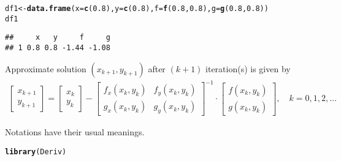 \documentclass[11pt, a4paper]{article}\usepackage[]{graphicx}\usepackage[]{xcolor}
\makeatletter
\newcommand{\hlnum}[1]{\textcolor[rgb]{0.686,0.059,0.569}{#1}}%
\newcommand{\hldef}[1]{\textcolor[rgb]{0.345,0.345,0.345}{#1}}%
\newcommand{\hlkwb}[1]{\textcolor[rgb]{0.69,0.353,0.396}{#1}}%
\newcommand{\hlkwc}[1]{\textcolor[rgb]{0.333,0.667,0.333}{#1}}%
\newcommand{\hlkwd}[1]{\textcolor[rgb]{0.737,0.353,0.396}{\textbf{#1}}}%
\newenvironment{kframe}{%
 \def\at@end@of@kframe{}%
 \ifinner\ifhmode%
  \def\at@end@of@kframe{\end{minipage}}%
  \begin{minipage}{\columnwidth}%
 \fi\fi%
 \def\FrameCommand##1{\hskip\@totalleftmargin \hskip-\fboxsep
 \colorbox{shadecolor}{##1}\hskip-\fboxsep
     \hskip-\linewidth \hskip-\@totalleftmargin \hskip\columnwidth}%
 \MakeFramed {\advance\hsize-\width
   \@totalleftmargin\z@ \linewidth\hsize
   \@setminipage}}%
 {\par\unskip\endMakeFramed%
 \at@end@of@kframe}
\newenvironment{knitrout}{}{} %
\makeatother
\begin{document}
\begin{knitrout}\footnotesize
{}\color{fgcolor}\begin{kframe}
\begin{alltt}
\hldef{df1} \hlkwb{<-} \hlkwd{data.frame}\hldef{(}\hlkwc{x} \hldef{=} \hlkwd{c}\hldef{(}\hlnum{0.8}\hldef{),} \hlkwc{y} \hldef{=} \hlkwd{c}\hldef{(}\hlnum{0.8}\hldef{),} \hlkwc{f} \hldef{=} \hlkwd{f}\hldef{(}\hlnum{0.8}\hldef{,} \hlnum{0.8}\hldef{),} \hlkwc{g} \hldef{=} \hlkwd{g}\hldef{(}\hlnum{0.8}\hldef{,} \hlnum{0.8}\hldef{))}
\hldef{df1}
\end{alltt}
\begin{verbatim}
##     x   y     f     g
## 1 0.8 0.8 -1.44 -1.08
\end{verbatim}
\end{kframe}
\end{knitrout}

Approximate solution $(x_{k+1}, y_{k+1})$ after $(k+1)$ iteration(s) is given by
\begin{gather*}
  \begin{bmatrix} x_{k+1} \\ y_{k+1} \end{bmatrix} 
  =
  \begin{bmatrix} x_{k} \\ y_{k} \end{bmatrix}
  -
  \begin{bmatrix} f_x(x_k, y_k) & f_y(x_k, y_k) \\ g_x(x_k, y_k) & g_y(x_k, y_k)  \end{bmatrix} ^{-1}
  \cdot
  \begin{bmatrix} f(x_k, y_k) \\ g(x_k, y_k) \end{bmatrix}, \,\,\,\,\,\, k = 0, 1, 2, \ldots
\end{gather*}

\vspace{0.5cm}

Notations have their usual meanings. \\

\begin{knitrout}\footnotesize
{}\color{fgcolor}\begin{kframe}
\begin{alltt}
\hlkwd{library}\hldef{(Deriv)}
\end{alltt}
\end{kframe}
\end{knitrout}
\end{document}
